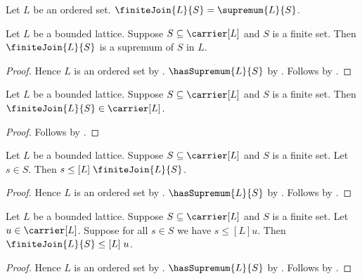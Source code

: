 \begin{definition}\label{finite_join}
    Let $L$ be an ordered set.
    $\finiteJoin{L}{S}=\supremum{L}{S}$.
\end{definition}

\begin{theorem}\label{finite_join_is_supremum}
    Let $L$ be a bounded lattice.
    Suppose $S\subseteq\carrier[L]$ and $S$ is a finite set.
    Then $\finiteJoin{L}{S}$ is a supremum of $S$ in $L$.
\end{theorem}
\begin{proof}
    Hence $L$ is an ordered set by .
    $\hasSupremum{L}{S}$ by .
    Follows by .
\end{proof}

\begin{proposition}\label{finite_join_type}
    Let $L$ be a bounded lattice.
    Suppose $S\subseteq\carrier[L]$ and $S$ is a finite set.
    Then $\finiteJoin{L}{S}\in\carrier[L]$.
\end{proposition}
\begin{proof}
    Follows by
        .
\end{proof}

\begin{proposition}\label{finite_join_upper}
    Let $L$ be a bounded lattice.
    Suppose $S\subseteq\carrier[L]$ and $S$ is a finite set.
    Let $s\in S$.
    Then $s\mathrel{\leq[L]}\finiteJoin{L}{S}$.
\end{proposition}
\begin{proof}
    Hence $L$ is an ordered set by .
    $\hasSupremum{L}{S}$ by .
    Follows by .
\end{proof}

\begin{proposition}\label{finite_join_least}
    Let $L$ be a bounded lattice.
    Suppose $S\subseteq\carrier[L]$ and $S$ is a finite set.
    Let $u\in\carrier[L]$.
    Suppose for all $s\in S$ we have $s\mathrel{\leq[L]}u$.
    Then $\finiteJoin{L}{S}\mathrel{\leq[L]}u$.
\end{proposition}
\begin{proof}
    Hence $L$ is an ordered set by .
    $\hasSupremum{L}{S}$ by .
    Follows by .
\end{proof}

